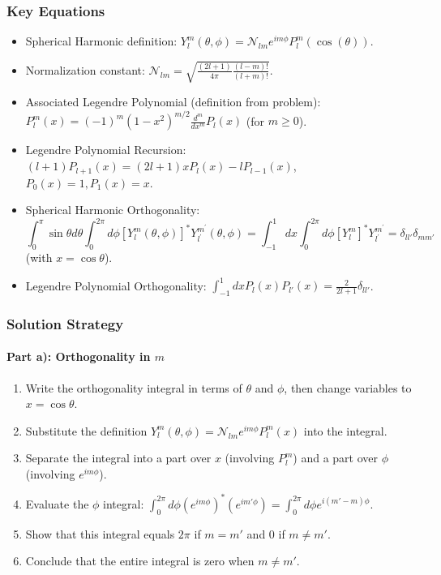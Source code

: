 \documentclass[10pt]{article}
\begin{document}
\subsubsection*{Key Equations}
\begin{itemize}
    \item Spherical Harmonic definition: \(Y_{l}^{m}(\theta, \phi)=\mathcal{N}_{lm} e^{i m \phi} P_{l}^{m}(\cos (\theta))\).
    \item Normalization constant: \(\mathcal{N}_{lm} = \sqrt{\frac{(2l+1)}{4\pi} \frac{(l-m)!}{(l+m)!}}\).
    \item Associated Legendre Polynomial (definition from problem): \(P_{l}^{m}(x)=(-1)^{m}\left(1-x^{2}\right)^{m / 2} \frac{d^{m}}{d x^{m}} P_{l}(x)\) (for \(m\ge 0\)).
    \item Legendre Polynomial Recursion: \((l+1) P_{l+1}(x)=(2 l+1) x P_{l}(x)-l P_{l-1}(x)\), \(P_0(x)=1, P_1(x)=x\).
    \item Spherical Harmonic Orthogonality:
    \[ \int_{0}^{\pi} \sin\theta d\theta \int_{0}^{2\pi} d\phi [Y_{l}^{m}(\theta, \phi)]^{*} Y_{l^{\prime}}^{m^{\prime}}(\theta, \phi) = \int_{-1}^{1} dx \int_{0}^{2\pi} d\phi [Y_{l}^{m}]^{*} Y_{l^{\prime}}^{m^{\prime}} = \delta_{ll'} \delta_{mm'} \]
    (with \(x = \cos\theta\)).
    \item Legendre Polynomial Orthogonality: \(\int_{-1}^{1} dx P_l(x) P_{l'}(x) = \frac{2}{2l+1} \delta_{ll'}\).
\end{itemize}

\subsubsection*{Solution Strategy}

\paragraph{Part a): Orthogonality in \(m\)}
\begin{enumerate}
    \item Write the orthogonality integral in terms of \(\theta\) and \(\phi\), then change variables to \(x = \cos\theta\).
    \item Substitute the definition \(Y_{l}^{m}(\theta, \phi)=\mathcal{N}_{lm} e^{i m \phi} P_{l}^{m}(x)\) into the integral.
    \item Separate the integral into a part over \(x\) (involving \(P_l^m\)) and a part over \(\phi\) (involving \(e^{im\phi}\)).
    \item Evaluate the \(\phi\) integral: \( \int_{0}^{2\pi} d\phi (e^{im\phi})^* (e^{im'\phi}) = \int_{0}^{2\pi} d\phi e^{i(m'-m)\phi} \).
    \item Show that this integral equals \(2\pi\) if \(m=m'\) and \(0\) if \(m \neq m'\).
    \item Conclude that the entire integral is zero when \(m \neq m'\).
\end{enumerate}
\end{document}
